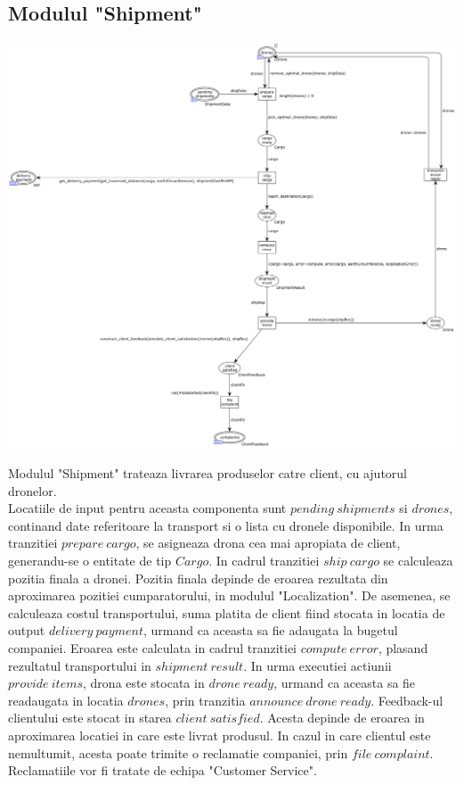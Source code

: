 \begin{spacing}{1.5}
\section{Modulul "Shipment"}

\includegraphics[width=\textwidth]{./Parts/Chapter1/Shipment.png}

Modulul "Shipment" trateaza livrarea produselor catre client, cu ajutorul dronelor.\\
Locatiile de input pentru aceasta componenta sunt $pending\ shipments$ si $drones$, continand date
referitoare la transport si o lista cu dronele disponibile. In urma tranzitiei $prepare\ cargo$, se asigneaza
drona cea mai apropiata de client, generandu-se o entitate de tip $Cargo$. In cadrul tranzitiei $ship\ cargo$
se calculeaza pozitia finala a dronei. Pozitia finala depinde de eroarea rezultata din aproximarea pozitiei
cumparatorului, in modulul "Localization". De asemenea, se calculeaza costul transportului, suma platita
de client fiind stocata in locatia de output $delivery\ payment$, urmand ca aceasta sa fie adaugata
la bugetul companiei. Eroarea este calculata in cadrul tranzitiei $compute\ error$, plasand rezultatul
transportului in $shipment\ result$. In urma executiei actiunii $provide\ items$, drona este stocata in
$drone\ ready$, urmand ca aceasta sa fie readaugata in locatia $drones$, prin tranzitia
$announce\ drone\ ready$. Feedback-ul clientului este stocat in starea $client\ satisfied$.
Acesta depinde de eroarea in aproximarea locatiei in care este livrat produsul. In cazul in care
clientul este nemultumit, acesta poate trimite o reclamatie companiei, prin $file\ complaint$.
Reclamatiile vor fi tratate de echipa "Customer Service".


\end{spacing}
